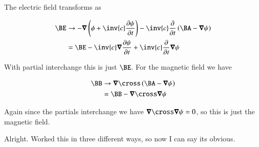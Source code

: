 The electric field transforms as 

\begin{align*}
\BE &\rightarrow -\spacegrad \left( \phi + \inv{c}\frac{\partial \psi}{\partial t}\right) - \inv{c}\frac{\partial }{\partial t} \left( \BA - \spacegrad \psi \right) \\
&= \BE -\inv{c} \spacegrad \frac{\partial \psi}{\partial t} + \inv{c}\frac{\partial }{\partial t} \spacegrad \psi 
\end{align*}

With partial interchange this is just $\BE$.  For the magnetic field we have

\begin{align*}
\BB 
&\rightarrow \spacegrad \cross \left( \BA - \spacegrad \psi \right) \\
&= \BB  - \spacegrad \cross \spacegrad \psi 
\end{align*}

Again since the partials interchange we have $\spacegrad \cross \spacegrad \psi = 0$, so this is just the magnetic field.

Alright.  Worked this in three different ways, so now I can say its obvious.

\EndArticle

